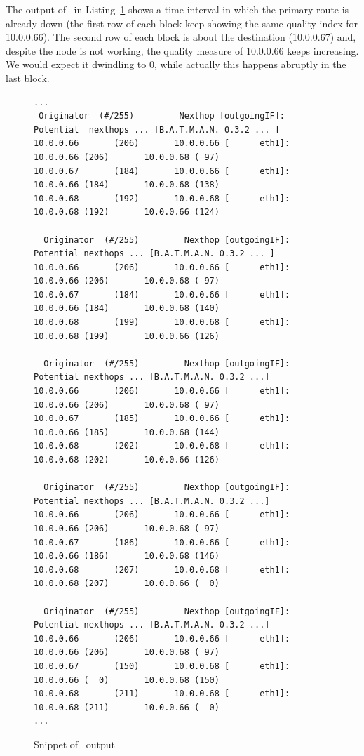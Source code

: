 The output of \batman\ in Listing~\ref{lst:batman_log} shows a time
interval in which the primary route is already down (the first row
of each block keep showing the same quality index for 10.0.0.66).
The second row of each block is about the destination (10.0.0.67) and,
despite the node is not working, the quality measure of 10.0.0.66 keeps
increasing. We would expect it dwindling to 0, while actually this
happens abruptly in the last block.

\begin{figure}[tbhp]
\begin{Verbatim}[fontsize=\footnotesize]
...
 Originator  (#/255)         Nexthop [outgoingIF]:   Potential  nexthops ... [B.A.T.M.A.N. 0.3.2 ... ]
10.0.0.66       (206)       10.0.0.66 [      eth1]:       10.0.0.66 (206)       10.0.0.68 ( 97)
10.0.0.67       (184)       10.0.0.66 [      eth1]:       10.0.0.66 (184)       10.0.0.68 (138)
10.0.0.68       (192)       10.0.0.68 [      eth1]:       10.0.0.68 (192)       10.0.0.66 (124)

  Originator  (#/255)         Nexthop [outgoingIF]:   Potential nexthops ... [B.A.T.M.A.N. 0.3.2 ... ]
10.0.0.66       (206)       10.0.0.66 [      eth1]:       10.0.0.66 (206)       10.0.0.68 ( 97)
10.0.0.67       (184)       10.0.0.66 [      eth1]:       10.0.0.66 (184)       10.0.0.68 (140)
10.0.0.68       (199)       10.0.0.68 [      eth1]:       10.0.0.68 (199)       10.0.0.66 (126)

  Originator  (#/255)         Nexthop [outgoingIF]:   Potential nexthops ... [B.A.T.M.A.N. 0.3.2 ...]
10.0.0.66       (206)       10.0.0.66 [      eth1]:       10.0.0.66 (206)       10.0.0.68 ( 97)
10.0.0.67       (185)       10.0.0.66 [      eth1]:       10.0.0.66 (185)       10.0.0.68 (144)
10.0.0.68       (202)       10.0.0.68 [      eth1]:       10.0.0.68 (202)       10.0.0.66 (126)

  Originator  (#/255)         Nexthop [outgoingIF]:   Potential nexthops ... [B.A.T.M.A.N. 0.3.2 ...]
10.0.0.66       (206)       10.0.0.66 [      eth1]:       10.0.0.66 (206)       10.0.0.68 ( 97)
10.0.0.67       (186)       10.0.0.66 [      eth1]:       10.0.0.66 (186)       10.0.0.68 (146)
10.0.0.68       (207)       10.0.0.68 [      eth1]:       10.0.0.68 (207)       10.0.0.66 (  0)

  Originator  (#/255)         Nexthop [outgoingIF]:   Potential nexthops ... [B.A.T.M.A.N. 0.3.2 ...]
10.0.0.66       (206)       10.0.0.66 [      eth1]:       10.0.0.66 (206)       10.0.0.68 ( 97)
10.0.0.67       (150)       10.0.0.68 [      eth1]:       10.0.0.66 (  0)       10.0.0.68 (150)
10.0.0.68       (211)       10.0.0.68 [      eth1]:       10.0.0.68 (211)       10.0.0.66 (  0)
...
\end{Verbatim}
\caption{Snippet of \batman\ output}
\label{lst:batman_log}
\end{figure}

